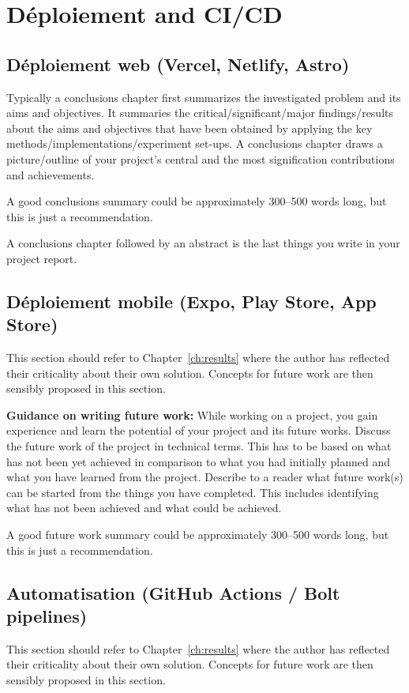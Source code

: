 \chapter{Déploiement and CI/CD}
\label{ch:con}
\section{Déploiement web (Vercel, Netlify, Astro)}
Typically a conclusions chapter first summarizes the investigated problem and its aims and objectives. It summaries the critical/significant/major findings/results about the aims and objectives that have been obtained by applying the key methods/implementations/experiment set-ups. A conclusions chapter draws a picture/outline of your project's central and the most signification contributions and achievements. 

A good conclusions summary could be approximately 300--500 words long, but this is just a recommendation.

A conclusions chapter followed by an abstract is the last things you write in your project report.

\section{Déploiement mobile (Expo, Play Store, App Store)}
This section should refer to Chapter~\ref{ch:results} where the author has reflected their criticality about their own solution. Concepts for future work are then sensibly proposed in this section.

\textbf{Guidance on writing future work:} While working on a project, you gain experience and learn the potential of your project and its future works. Discuss the future work of the project in technical terms. This has to be based on what has not been yet achieved in comparison to what you had initially planned and what you have learned from the project. Describe to a reader what future work(s) can be started from the things you have completed. This includes identifying what has not been achieved and what could be achieved. 



A good future work summary could be approximately 300--500 words long, but this is just a recommendation.


\section{Automatisation (GitHub Actions / Bolt pipelines)}
This section should refer to Chapter~\ref{ch:results} where the author has reflected their criticality about their own solution. Concepts for future work are then sensibly proposed in this section.

